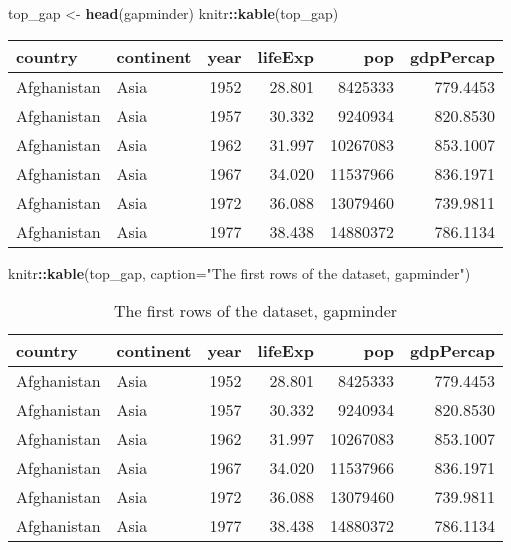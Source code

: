 \documentclass[
]{article}
\newenvironment{Shaded}{\begin{snugshade}}{\end{snugshade}}
\newcommand{\AttributeTok}[1]{\textcolor[rgb]{0.13,0.29,0.53}{#1}}
\newcommand{\FunctionTok}[1]{\textcolor[rgb]{0.13,0.29,0.53}{\textbf{#1}}}
\newcommand{\NormalTok}[1]{#1}
\newcommand{\OtherTok}[1]{\textcolor[rgb]{0.56,0.35,0.01}{#1}}
\newcommand{\SpecialCharTok}[1]{\textcolor[rgb]{0.81,0.36,0.00}{\textbf{#1}}}
\newcommand{\StringTok}[1]{\textcolor[rgb]{0.31,0.60,0.02}{#1}}
\begin{document}
\begin{Shaded}
\begin{Highlighting}[]
\NormalTok{top\_gap }\OtherTok{\textless{}{-}} \FunctionTok{head}\NormalTok{(gapminder)}
\NormalTok{knitr}\SpecialCharTok{::}\FunctionTok{kable}\NormalTok{(top\_gap)}
\end{Highlighting}
\end{Shaded}

\begin{tabular}{l|l|r|r|r|r}
\hline
country & continent & year & lifeExp & pop & gdpPercap\\
\hline
Afghanistan & Asia & 1952 & 28.801 & 8425333 & 779.4453\\
\hline
Afghanistan & Asia & 1957 & 30.332 & 9240934 & 820.8530\\
\hline
Afghanistan & Asia & 1962 & 31.997 & 10267083 & 853.1007\\
\hline
Afghanistan & Asia & 1967 & 34.020 & 11537966 & 836.1971\\
\hline
Afghanistan & Asia & 1972 & 36.088 & 13079460 & 739.9811\\
\hline
Afghanistan & Asia & 1977 & 38.438 & 14880372 & 786.1134\\
\hline
\end{tabular}

\begin{Shaded}
\begin{Highlighting}[]
\NormalTok{knitr}\SpecialCharTok{::}\FunctionTok{kable}\NormalTok{(top\_gap,}
             \AttributeTok{caption=}\StringTok{"The first rows of the dataset, gapminder"}\NormalTok{)}
\end{Highlighting}
\end{Shaded}

\begin{table}

\caption{\label{tab:unnamed-chunk-4}The first rows of the dataset, gapminder}
\centering
\begin{tabular}[t]{l|l|r|r|r|r}
\hline
country & continent & year & lifeExp & pop & gdpPercap\\
\hline
Afghanistan & Asia & 1952 & 28.801 & 8425333 & 779.4453\\
\hline
Afghanistan & Asia & 1957 & 30.332 & 9240934 & 820.8530\\
\hline
Afghanistan & Asia & 1962 & 31.997 & 10267083 & 853.1007\\
\hline
Afghanistan & Asia & 1967 & 34.020 & 11537966 & 836.1971\\
\hline
Afghanistan & Asia & 1972 & 36.088 & 13079460 & 739.9811\\
\hline
Afghanistan & Asia & 1977 & 38.438 & 14880372 & 786.1134\\
\hline
\end{tabular}
\end{table}
\end{document}
